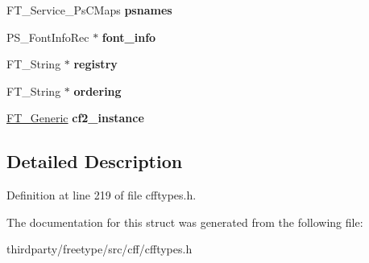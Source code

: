 \begin{DoxyCompactItemize}
F\+T\+\_\+\+Service\+\_\+\+Ps\+C\+Maps {\bfseries psnames}
\item 
\mbox{\label{struct_c_f_f___font_rec___aef0c3f15cb298c702c4a04a7f7881fb5}} 
P\+S\+\_\+\+Font\+Info\+Rec $\ast$ {\bfseries font\+\_\+info}
\item 
\mbox{\label{struct_c_f_f___font_rec___ac3fa8d36da65d400e3cf5196e4f1195f}} 
F\+T\+\_\+\+String $\ast$ {\bfseries registry}
\item 
\mbox{\label{struct_c_f_f___font_rec___ae6f4261f8f4b5b3a87fa96dd0cb235da}} 
F\+T\+\_\+\+String $\ast$ {\bfseries ordering}
\item 
\mbox{\label{struct_c_f_f___font_rec___a547fb16af030ff0c7494c2db5749e486}} 
\hyperlink{struct_f_t___generic__}{F\+T\+\_\+\+Generic} {\bfseries cf2\+\_\+instance}
\end{DoxyCompactItemize}


\subsection{Detailed Description}


Definition at line 219 of file cfftypes.\+h.



The documentation for this struct was generated from the following file\+:\begin{DoxyCompactItemize}
\item 
thirdparty/freetype/src/cff/cfftypes.\+h\end{DoxyCompactItemize}
